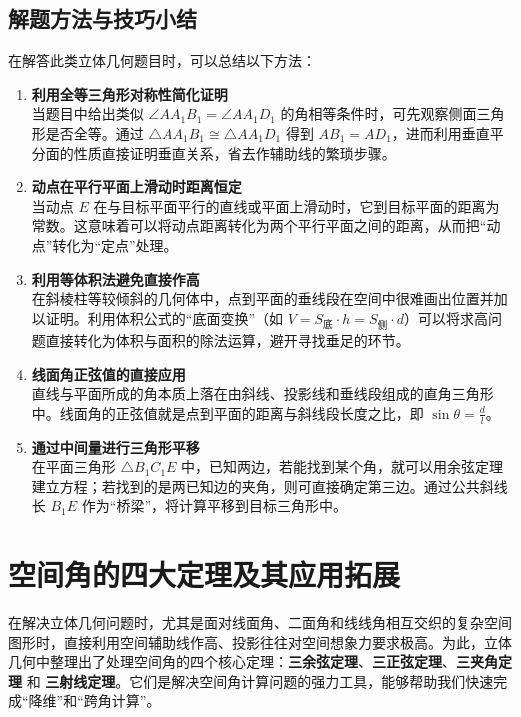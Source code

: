 \documentclass[11pt,a4paper]{ctexart}
\begin{document}
\subsection{解题方法与技巧小结}
在解答此类立体几何题目时，可以总结以下方法：
\begin{enumerate}
    \item \textbf{利用全等三角形对称性简化证明} \\
    当题目中给出类似 $\angle AA_1B_1 = \angle AA_1D_1$ 的角相等条件时，可先观察侧面三角形是否全等。通过 $\triangle AA_1B_1 \cong \triangle AA_1D_1$ 得到 $AB_1 = AD_1$，进而利用垂直平分面的性质直接证明垂直关系，省去作辅助线的繁琐步骤。
    \item \textbf{动点在平行平面上滑动时距离恒定} \\
    当动点 $E$ 在与目标平面平行的直线或平面上滑动时，它到目标平面的距离为常数。这意味着可以将动点距离转化为两个平行平面之间的距离，从而把“动点”转化为“定点”处理。
    \item \textbf{利用等体积法避免直接作高} \\
    在斜棱柱等较倾斜的几何体中，点到平面的垂线段在空间中很难画出位置并加以证明。利用体积公式的“底面变换”（如 $V = S_{\text{底}} \cdot h = S_{\text{侧}} \cdot d$）可以将求高问题直接转化为体积与面积的除法运算，避开寻找垂足的环节。
    \item \textbf{线面角正弦值的直接应用} \\
    直线与平面所成的角本质上落在由斜线、投影线和垂线段组成的直角三角形中。线面角的正弦值就是点到平面的距离与斜线段长度之比，即 $\sin\theta = \frac{d}{l}$。
    \item \textbf{通过中间量进行三角形平移} \\
    在平面三角形 $\triangle B_1C_1E$ 中，已知两边，若能找到某个角，就可以用余弦定理建立方程；若找到的是两已知边的夹角，则可直接确定第三边。通过公共斜线长 $B_1E$ 作为“桥梁”，将计算平移到目标三角形中。
\end{enumerate}

\newpage
\section{空间角的四大定理及其应用拓展}

在解决立体几何问题时，尤其是面对线面角、二面角和线线角相互交织的复杂空间图形时，直接利用空间辅助线作高、投影往往对空间想象力要求极高。为此，立体几何中整理出了处理空间角的四个核心定理：\textbf{三余弦定理}、\textbf{三正弦定理}、\textbf{三夹角定理} 和 \textbf{三射线定理}。它们是解决空间角计算问题的强力工具，能够帮助我们快速完成“降维”和“跨角计算”。
\end{document}
